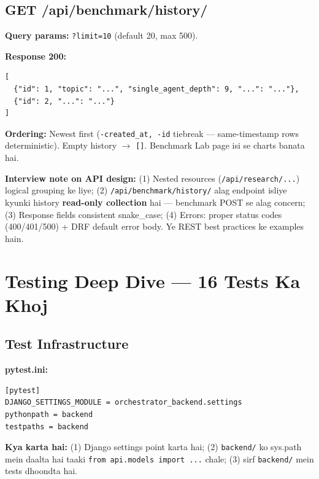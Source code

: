 \subsection{GET /api/benchmark/history/}

\begin{codestorybox}
\textbf{Query params:} \texttt{?limit=10} (default 20, max 500).

\textbf{Response 200:}
\begin{lstlisting}[style=jsonstyle]
[
  {"id": 1, "topic": "...", "single_agent_depth": 9, "...": "..."},
  {"id": 2, "...": "..."}
]
\end{lstlisting}

\textbf{Ordering:} Newest first (\texttt{-created\_at, -id} tiebreak --- same-timestamp rows deterministic). Empty history $\rightarrow$ \texttt{[]}. Benchmark Lab page isi se charts banata hai.
\end{codestorybox}

\begin{warningbox}
\textbf{Interview note on API design:} (1) Nested resources (\texttt{/api/research/...}) logical grouping ke liye; (2) \texttt{/api/benchmark/history/} alag endpoint isliye kyunki history \textbf{read-only collection} hai --- benchmark POST se alag concern; (3) Response fields consistent snake\_case; (4) Errors: proper status codes (400/401/500) + DRF default error body. Ye REST best practices ke examples hain.
\end{warningbox}

\section{Testing Deep Dive --- 16 Tests Ka Khoj}

\subsection{Test Infrastructure}

\begin{codestorybox}
\textbf{pytest.ini:}
\begin{lstlisting}[style=bashstyle]
[pytest]
DJANGO_SETTINGS_MODULE = orchestrator_backend.settings
pythonpath = backend
testpaths = backend
\end{lstlisting}

\textbf{Kya karta hai:} (1) Django settings point karta hai; (2) \texttt{backend/} ko sys.path mein daalta hai taaki \texttt{from api.models import ...} chale; (3) sirf \texttt{backend/} mein tests dhoondta hai.
\end{codestorybox}

